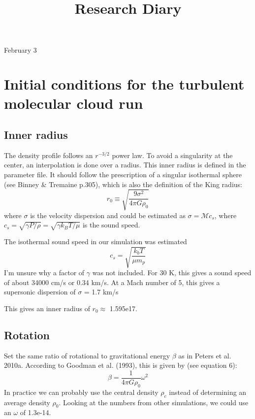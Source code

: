 \documentclass[11pt,letterpaper]{article}
\begin{document}

\title{Research Diary}

{\Huge February 3}\\[5mm]

\section*{Initial conditions for the turbulent molecular cloud run}

\subsection*{Inner radius}

The density profile follows an $r^{-3/2}$ power law. To avoid a singularity at the center, an interpolation is done over a radius. This inner radius is defined in the parameter file. It should follow the prescription of a singular isothermal sphere (see Binney \& Tremaine p.305), which is also the definition of the King radius:
\begin{equation}
r_0 \equiv \sqrt{\frac{9\sigma^2}{4\pi G\rho_0}}
\end{equation}
where $\sigma$ is the velocity dispersion and could be estimated as $\sigma = \mathcal{M} c_s$, where $c_s = \sqrt{\gamma P/\rho} = \sqrt{\gamma k_B T / \mu}$ is the sound speed.

The isothermal sound speed in our simulation was estimated
\begin{equation}
c_s = \sqrt{\frac{k_b T}{\mu m_p}}
\end{equation}
I'm unsure why a factor of $\gamma$ was not included. For 30 K, this gives a sound speed of about 34000 cm/s or 0.34 km/s. At a Mach number of 5, this gives a supersonic dispersion of $\sigma$ = 1.7 km/s

This gives an inner radius of $r_0 \approx$ 1.595e17. 

\subsection*{Rotation}

Set the same ratio of rotational to gravitational energy $\beta$ as in Peters et al. 2010a. According to Goodman et al. (1993), this is given by (see equation 6):
\begin{equation}
\beta = \frac{1}{4 \pi G \rho_0} \omega^2
\end{equation}
In practice we can probably use the central density $\rho_c$ instead of determining an average density $\rho_0$. Looking at the numbers from other simulations, we could use an $\omega$ of 1.3e-14.
\end{document}
